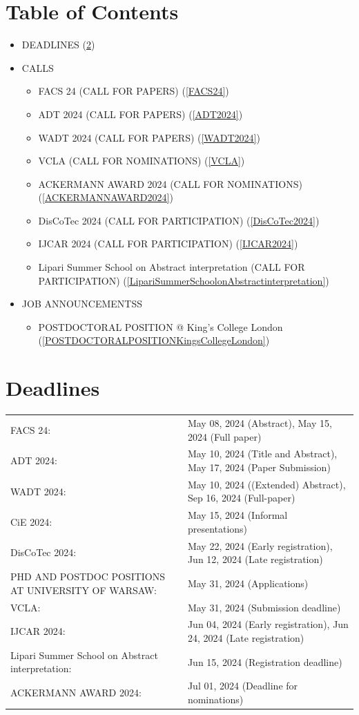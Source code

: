 \documentclass[prodmode,acmtecs]{acmsmall} %
\begin{document}
\section{Table of Contents}\begin{itemize}\item DEADLINES (\cref{deadlines}) 
 
\item CALLS 
 
\begin{itemize}\item FACS 24 (CALL FOR PAPERS) (\cref{FACS24})
\item ADT 2024 (CALL FOR PAPERS) (\cref{ADT2024})
\item WADT 2024 (CALL FOR PAPERS) (\cref{WADT2024})
\item VCLA (CALL FOR NOMINATIONS) (\cref{VCLA})
\item ACKERMANN AWARD 2024 (CALL FOR NOMINATIONS) (\cref{ACKERMANNAWARD2024})
\item DisCoTec 2024 (CALL FOR PARTICIPATION) (\cref{DisCoTec2024})
\item IJCAR 2024 (CALL FOR PARTICIPATION) (\cref{IJCAR2024})
\item Lipari Summer School on Abstract interpretation (CALL FOR PARTICIPATION) (\cref{LipariSummerSchoolonAbstractinterpretation})
\end{itemize} 
\item JOB ANNOUNCEMENTSS 
 
\begin{itemize}\item POSTDOCTORAL POSITION @ King's College London (\cref{POSTDOCTORALPOSITIONKingsCollegeLondon})
\end{itemize} 
\end{itemize}\section{Deadlines}\label{deadlines}\begin{tabulary}{\linewidth}{LL}FACS 24:  & May 08, 2024 (Abstract), May 15, 2024 (Full paper) \\
ADT 2024:  & May 10, 2024 (Title and Abstract), May 17, 2024 (Paper Submission) \\
WADT 2024:  & May 10, 2024 ((Extended) Abstract), Sep 16, 2024 (Full-paper) \\
CiE 2024:  & May 15, 2024 (Informal presentations) \\
DisCoTec 2024:  & May 22, 2024 (Early registration), Jun 12, 2024 (Late registration) \\
PHD AND POSTDOC POSITIONS AT UNIVERSITY OF WARSAW:  & May 31, 2024 (Applications) \\
VCLA:  & May 31, 2024 (Submission deadline) \\
IJCAR 2024:  & Jun 04, 2024 (Early registration), Jun 24, 2024 (Late registration) \\
Lipari Summer School on Abstract interpretation:  & Jun 15, 2024 (Registration deadline) \\
ACKERMANN AWARD 2024:  & Jul 01, 2024 (Deadline for nominations) \\
\end{tabulary}
\end{document}
